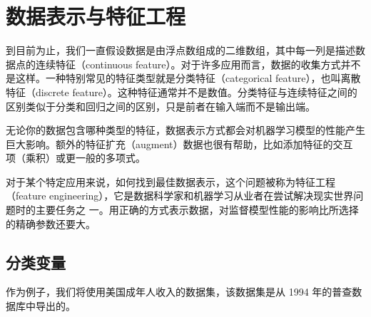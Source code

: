 \chapter{数据表示与特征工程}
到目前为止，我们一直假设数据是由浮点数组成的二维数组，其中每一列是描述数据点的连续特征（continuous feature）。对于许多应用而言，数据的收集方式并不是这样。一种特别常见的特征类型就是分类特征（categorical feature），也叫离散特征（discrete feature）。这种特征通常并不是数值。分类特征与连续特征之间的区别类似于分类和回归之间的区别，只是前者在输入端而不是输出端。

无论你的数据包含哪种类型的特征，数据表示方式都会对机器学习模型的性能产生巨大影响。额外的特征扩充（augment）数据也很有帮助，比如添加特征的交互
项（乘积）或更一般的多项式。

对于某个特定应用来说，如何找到最佳数据表示，这个问题被称为特征工程（feature
engineering），它是数据科学家和机器学习从业者在尝试解决现实世界问题时的主要任务之
一。用正确的方式表示数据，对监督模型性能的影响比所选择的精确参数还要大。
\section{分类变量}
作为例子，我们将使用美国成年人收入的数据集，该数据集是从 1994 年的普查数据库中导出的。


